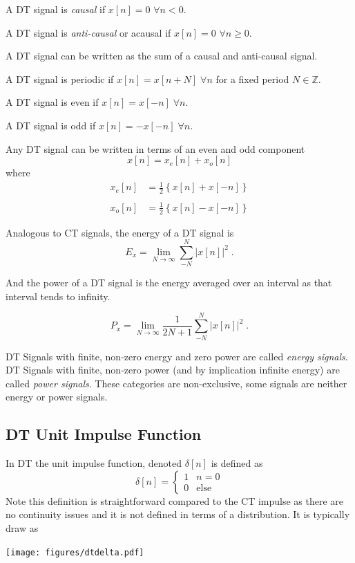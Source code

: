 \begin{definition}
A DT signal is \emph{causal} if $x[n] = 0$ $\forall n < 0$.
\end{definition}
\begin{definition}
A DT signal is \emph{anti-causal} or acausal if $x[n] = 0$ $\forall n \geq 0$.
\end{definition}

A DT signal can be written as the sum of a causal and anti-causal signal.

A DT signal is periodic if $x[n] = x[n + N] \; \forall n$ for a fixed period $N \in \mathbb{Z}$.

A DT signal is even if $x[n] = x[-n] \; \forall n$. 

A DT signal is odd if $x[n] = -x[-n] \; \forall n$.

Any DT signal can be written in terms of an even and odd component
\[
x[n] = x_e[n] + x_o[n] 
\]
where 
\[
\begin{array}{ll}
x_e[n] &= \frac{1}{2}\left\{x[n] + x[-n]\right\} \\
& \\
x_o[n] &= \frac{1}{2}\left\{x[n] - x[-n]\right\}
\end{array}
\]

Analogous to CT signals, the energy of a DT signal is
\[
E_x = \lim_{N\rightarrow\infty} \sum\limits_{-N}^N \lvert x[n]\rvert^2 \; .
\]

And the power of a DT signal is the energy averaged over an interval as that interval tends to infinity.

\[
P_x = \lim_{N\rightarrow\infty} \frac{1}{2N+1} \sum\limits_{-N}^N \lvert x[n]\rvert^2 \; .
\]

DT Signals with finite, non-zero energy and zero power are called {\it energy signals}. DT Signals with finite, non-zero power (and by implication infinite energy) are called {\it power signals}. These categories are non-exclusive, some signals are neither energy or power signals.

\subsection{DT Unit Impulse Function}

In DT the unit impulse function, denoted $\delta[n]$ is defined as
\[
\delta[n] = \left\{
\begin{array}{ll}
  1 & n = 0\\
  0 & \text{else}
\end{array}
\right.
\]
Note this definition is straightforward compared to the CT impulse as there are no continuity issues and it is not defined in terms of a distribution. It is typically draw as
\begin{center}
  \texttt{[image: figures/dtdelta.pdf]}
\end{center}

